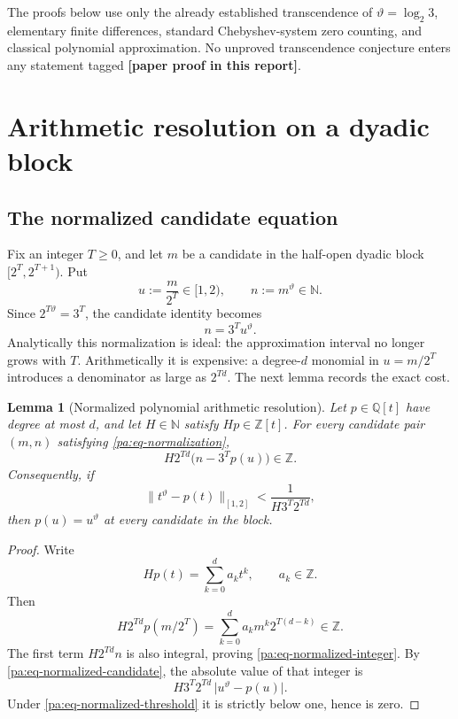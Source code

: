 \documentclass[11pt,oneside]{article}
\newtheorem{lemma}[theorem]{Lemma}
\theoremstyle{definition}
\theoremstyle{remark}
\newcommand{\N}{\mathbb N}
\newcommand{\Z}{\mathbb Z}
\newcommand{\Q}{\mathbb Q}
\newcommand{\thetaq}{\vartheta}
\newcommand{\statusnew}{\textcolor{newgreen}{\textbf{[paper proof in this report]}}}
\begin{document}
The proofs below use only the already established transcendence of
\(\thetaq=\log_2 3\), elementary finite differences, standard Chebyshev-system zero counting,
and classical polynomial approximation.  No unproved transcendence conjecture enters any
statement tagged \statusnew{}.

\section{Arithmetic resolution on a dyadic block}
\label{pa:sec-resolution}

\subsection{The normalized candidate equation}

Fix an integer \(T\ge0\), and let \(m\) be a candidate in the half-open dyadic block
\([2^T,2^{T+1})\).  Put
\begin{equation}
  u:=\frac{m}{2^T}\in[1,2),
  \qquad n:=m^{\thetaq}\in\N.
  \label{pa:eq-normalization}
\end{equation}
Since \(2^{T\thetaq}=3^T\), the candidate identity becomes
\begin{equation}
  n=3^T u^{\thetaq}.
  \label{pa:eq-normalized-candidate}
\end{equation}
Analytically this normalization is ideal: the approximation interval no longer grows with
\(T\).  Arithmetically it is expensive: a degree-\(d\) monomial in \(u=m/2^T\) introduces a
denominator as large as \(2^{Td}\).  The next lemma records the exact cost.

\begin{lemma}[Normalized polynomial arithmetic resolution]
\label{pa:lem-normalized-resolution}
Let \(p\in\Q[t]\) have degree at most \(d\), and let \(H\in\N\) satisfy
\(Hp\in\Z[t]\).  For every candidate pair \((m,n)\) satisfying
\eqref{pa:eq-normalization},
\begin{equation}
  H2^{Td}\bigl(n-3^T p(u)\bigr)\in\Z.
  \label{pa:eq-normalized-integer}
\end{equation}
Consequently, if
\begin{equation}
 \bigl\|t^{\thetaq}-p(t)\bigr\|_{[1,2]}
 <\frac{1}{H3^T2^{Td}},
 \label{pa:eq-normalized-threshold}
\end{equation}
then \(p(u)=u^{\thetaq}\) at every candidate in the block.
\end{lemma}

\begin{proof}
Write
\[
 Hp(t)=\sum_{k=0}^{d}a_kt^k,
 \qquad a_k\in\Z.
\]
Then
\[
 H2^{Td}p(m/2^T)
 =\sum_{k=0}^{d}a_km^k2^{T(d-k)}\in\Z.
\]
The first term \(H2^{Td}n\) is also integral, proving
\eqref{pa:eq-normalized-integer}.  By \eqref{pa:eq-normalized-candidate}, the
absolute value of that integer is
\[
 H3^T2^{Td}\,\bigl|u^{\thetaq}-p(u)\bigr|.
\]
Under \eqref{pa:eq-normalized-threshold} it is strictly below one, hence is zero.
\end{proof}
\end{document}
